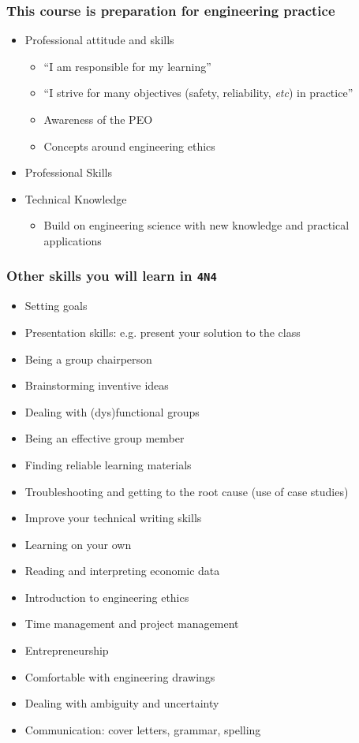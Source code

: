 \begin{frame}\frametitle{This course is preparation for engineering practice}
	\begin{itemize}
		\item	Professional attitude and skills
		\begin{itemize}
			\item	``I am responsible for my learning''
			\item	``I strive for many objectives (safety, reliability, \emph{etc}) in practice''
			\item	Awareness of the PEO
			\item	Concepts around engineering ethics
		\end{itemize}
		\item	Professional Skills
		\item	Technical Knowledge
		\begin{itemize}
			\item	Build on engineering science with new knowledge and practical applications
		\end{itemize}
	\end{itemize}
\end{frame}

\begin{frame}\frametitle{Other skills you will learn in \texttt{4N4}}
	\begin{itemize}
		\item	Setting goals
		\item	Presentation skills: e.g. present your solution to the class
		\item	Being a group chairperson
		\item	Brainstorming inventive ideas
		\item	Dealing with (dys)functional groups
		\item	Being an effective group member
		\item	Finding reliable learning materials
		\item	Troubleshooting and getting to the root cause {\scriptsize (use of case studies)}
		\item	Improve your technical writing skills
		\item	Learning on your own
		\item	Reading and interpreting economic data
		\item	Introduction to engineering ethics
		\item	Time management and project management
		\item	Entrepreneurship
		\item	Comfortable with engineering drawings
		\item	Dealing with ambiguity and uncertainty		
		\item	Communication: cover letters, grammar, spelling
	\end{itemize}	
\end{frame}

